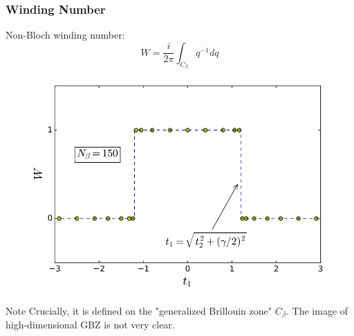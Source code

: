 \documentclass{beamer}
\begin{document}
   \begin{frame}
  \frametitle{Winding Number}
  Non-Bloch winding number:
  \begin{equation}
  W=\frac{i}{2\pi}\int_{C_\beta}q^{-1}dq
  \end{equation}
  \begin{figure}
  \includegraphics[scale=0.28]{figure/wind.png}
  \end{figure}

  
\begin{block}{Note}
Crucially, it is defined on the "generalized Brillouin zone" $C_{\beta}$. The image of high-dimensional GBZ is not very clear. 
\end{block}
\end{frame}
\end{document}
